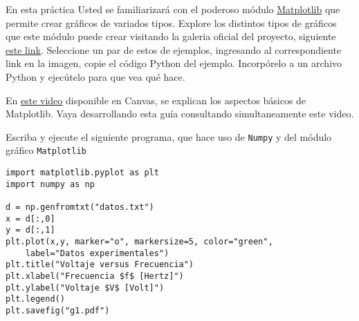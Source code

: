\documentclass[11pt]{exam}
\begin{document}
\firstpageheadrule
\runningheadrule
{}
\cfoot{ }
\begin{flushleft}
\vspace{0.2in}

\vspace{0.25cm}
\end{flushleft}

\begin{questions}

\item En esta práctica Usted se familiarizará con el poderoso módulo \href{https://matplotlib.org/}{Matplotlib} que permite crear gráficos de variados tipos. Explore los distintos tipos de gráficos que este módulo puede crear visitando la galeria oficial del proyecto, siguiente \href{https://matplotlib.org/stable/gallery/index}{este link}. Seleccione un par de estos de ejemplos, ingresando al correspondiente link en la imagen, copie el código Python del ejemplo. Incorpórelo a un archivo Python y ejecútelo para que vea qué hace.

\item En \href{https://udec.instructure.com/courses/40179/pages/matplotlib?module_item_id=1576193}{este video} disponible en Canvas, se explican los aspectos básicos de Matplotlib. Vaya desarrollando esta guía consultando simultaneamente este video.

\item Escriba y ejecute el siguiente programa, que hace uso de \texttt{Numpy} y del módulo gráfico \texttt{Matplotlib}

\begin{verbatim}
import matplotlib.pyplot as plt
import numpy as np

d = np.genfromtxt("datos.txt")
x = d[:,0]
y = d[:,1]
plt.plot(x,y, marker="o", markersize=5, color="green", 
	label="Datos experimentales")
plt.title("Voltaje versus Frecuencia")
plt.xlabel("Frecuencia $f$ [Hertz]")
plt.ylabel("Voltaje $V$ [Volt]")
plt.legend()
plt.savefig("g1.pdf")
\end{verbatim}


\end{questions}
\end{document}
